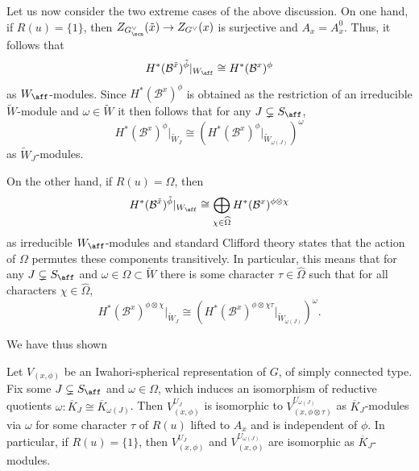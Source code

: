Let us now consider the two extreme cases of the above discussion. On one hand, if $R(u)=\{1\}$, then $Z_{G_{\scn}^\vee}(\tilde{x})\rightarrow Z_{G^\vee}(x)$ is surjective and $A_x=A_x^0$. Thus, it follows that 
\begin{equation}\label{eqn:isom_cover}
    H^*(\mathcal{B}^{\tilde{x}})^{\tilde{\phi}}|_{W_{\aff}}\cong H^*(\mathcal{B}^x)^\phi
\end{equation}
as $W_{\aff}$-modules. Since $H^*(\mathcal{B}^x)^\phi$ is obtained as the restriction of an irreducible $\widetilde{W}$-module and $\omega\in\widetilde{W}$ it then follows that for any $J\subsetneq S_{\aff}$,
\begin{equation}\label{eqn:twist_Ru_trivial}
    H^*(\mathcal{B}^x)^\phi|_{\widetilde{W}_J}\cong (H^*(\mathcal{B}^x)^\phi|_{\widetilde{W}_{\omega(J)}})^\omega
\end{equation}
as $\widetilde{W}_J$-modules.

On the other hand, if $R(u)=\Omega$, then 
$$H^*(\mathcal{B}^{\tilde{x}})^{\tilde{\phi}}|_{W_{\aff}}\cong\bigoplus_{\chi\in\widehat\Omega} H^*(\mathcal{B}^x)^{\phi\otimes\chi}$$
as irreducible $W_{\aff}$-modules and standard Clifford theory states that the action of $\Omega$ permutes these components transitively. In particular, this means that for any $J\subsetneq S_{\aff}$ and $\omega\in\Omega\subset\widetilde{W}$ there is some character $\tau\in\widehat{\Omega}$ such that for all characters $\chi\in\widehat{\Omega}$, 
\begin{equation}\label{eqn:twist_Ru_nontrivial}
    H^*(\mathcal{B}^x)^{\phi\otimes\chi}|_{\widetilde{W}_J}\cong (H^*(\mathcal{B}^x)^{\phi\otimes\chi\tau}|_{\widetilde{W}_{\omega(J)}})^\omega.
\end{equation}

We have thus shown

\begin{proposition}\label{prop:twist_fund_group}
    Let $V_{(x,\phi)}$ be an Iwahori-spherical representation of $G$, of simply connected type. Fix some $J\subsetneq S_{\aff}$ and $\omega\in\Omega$, which induces an isomorphism of reductive quotients $\omega:\overline{K}_J\cong\overline{K}_{\omega(J)}$. Then $V_{(x,\phi)}^{U_J}$ is isomorphic to $V_{(x,\phi\otimes\tau)}^{U_{\omega(J)}}$ as $\overline{K}_J$-modules via $\omega$ for some character $\tau$ of $R(u)$ lifted to $A_x$ and is independent of $\phi$. In particular, if $R(u)=\{1\}$, then $V_{(x,\phi)}^{U_J}$ and $V_{(x,\phi)}^{U_{\omega(J)}}$ are isomorphic as $\overline{K}_J$-modules.
\end{proposition}

